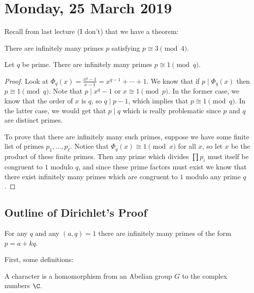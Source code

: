 
\section{Monday, 25 March 2019}

Recall from last lecture (I don't) that we have a theorem:

\begin{theorem*}
	There are infinitely many primes $p$ satisfying $p \cong 3 \pmod{4}$.
\end{theorem*}

\begin{lemma*}
	Let $q$ be prime. There are infinitely many primes $p \cong 1 \pmod{q}$.
\end{lemma*}

\begin{proof}
	Look at $\Phi_q(x) = \frac{x^q-1}{x-1} = x^{q-1} + \cdots + 1$.
	We know that if $p \mid \Phi_q(x)$ then $p \cong 1 \pmod{q}$.
	Note that $p \mid x^q - 1$ or $x \cong 1 \pmod{p}$.
	In the former case, we know that the order of $x$ is $q$, so $q \mid p-1$, 
	which implies that $p \cong 1 \pmod{q}$.
	In the latter case, we would get that $p \mid q$ which is really problematic 
	since $p$ and $q$ are distinct primes.

	To prove that there are infinitely many such primes, suppose we have some 
	finite list of primes $p_1, \dotsc, p_\ell$.
	Notice that $\Phi_q(x) \cong 1 \pmod{x}$ for all $x$, so let $x$ be
	the product of these finite primes. Then any prime which divides $\prod p_i$
	must itself be congruent to $1$ modulo $q$, and since these prime factors
	must exist we know that there exist infinitely many primes which are 
	congruent to $1$ modulo any prime $q$.
\end{proof}

\subsection*{Outline of Dirichlet's Proof}

\begin{theorem}
	For any $q$ and any $(a,q) = 1$ there are infinitely many primes of the form
	$p = a + kq$.
\end{theorem}

First, some definitions:

\begin{definition}[Character]
	A character is a homomorphism from an Abelian group $G$ to the complex
	numbers $\C$.
\end{definition}

